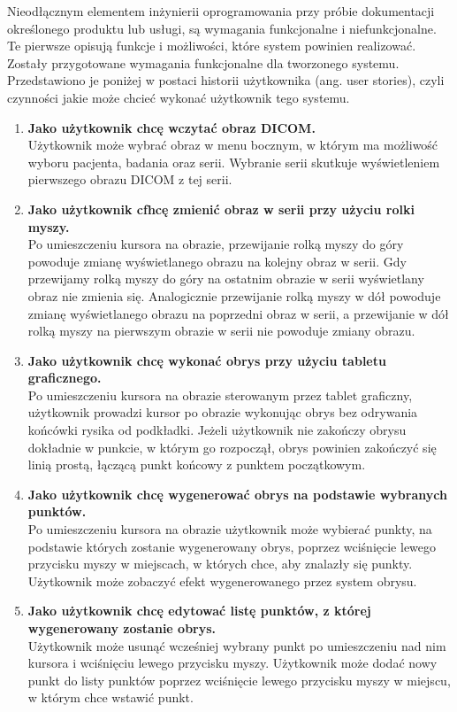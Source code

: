 \documentclass[a4paper,11pt,twoside,openright]{report}
\theoremstyle{definition}
\begin{document}
Nieodłącznym elementem inżynierii oprogramowania przy próbie dokumentacji
określonego produktu lub usługi, są wymagania funkcjonalne i niefunkcjonalne.
Te pierwsze opisują funkcje i możliwości, które system powinien realizować.
Zostały przygotowane wymagania funkcjonalne dla tworzonego systemu. Przedstawiono
je poniżej w postaci historii użytkownika (ang. user stories), czyli czynności
jakie może chcieć wykonać użytkownik tego systemu.
\begin{enumerate}
\item \textbf {Jako użytkownik chcę wczytać obraz DICOM.} \\
Użytkownik może wybrać obraz w menu bocznym, w którym ma możliwość wyboru pacjenta,
badania oraz serii. Wybranie serii skutkuje wyświetleniem pierwszego obrazu DICOM z tej serii.

\item \textbf {Jako użytkownik cfhcę zmienić obraz w serii przy użyciu rolki myszy.} \\
Po umieszczeniu kursora na obrazie, przewijanie rolką myszy do góry powoduje zmianę
wyświetlanego obrazu na kolejny obraz w serii. Gdy przewijamy rolką myszy do góry
na ostatnim obrazie w serii wyświetlany obraz nie zmienia się. Analogicznie
przewijanie rolką myszy w dół powoduje zmianę wyświetlanego obrazu na poprzedni
obraz w serii, a przewijanie w dół rolką myszy na pierwszym obrazie w serii nie
powoduje zmiany obrazu.

\item \textbf {Jako użytkownik chcę wykonać obrys przy użyciu tabletu graficznego.} \\
Po umieszczeniu kursora na obrazie sterowanym przez tablet graficzny, użytkownik
prowadzi kursor po obrazie wykonując obrys bez odrywania końcówki rysika od podkładki.
Jeżeli użytkownik nie zakończy obrysu dokładnie w punkcie, w którym go rozpoczął,
obrys powinien zakończyć się linią prostą, łączącą punkt końcowy z punktem początkowym.

\item \textbf {Jako użytkownik chcę wygenerować obrys na podstawie wybranych punktów.} \\
Po umieszczeniu kursora na obrazie użytkownik może wybierać punkty, na podstawie
których zostanie wygenerowany obrys, poprzez wciśnięcie lewego przycisku myszy w
miejscach, w których chce, aby znalazły się punkty. Użytkownik może zobaczyć efekt
wygenerowanego przez system obrysu.

\item \textbf {Jako użytkownik chcę edytować listę punktów, z której wygenerowany zostanie obrys.} \\
Użytkownik może usunąć wcześniej wybrany punkt po umieszczeniu nad nim kursora i
wciśnięciu lewego przycisku myszy. Użytkownik może dodać nowy punkt do listy punktów
poprzez wciśnięcie lewego przycisku myszy w miejscu, w którym chce wstawić punkt.


\end{enumerate}
\end{document}
